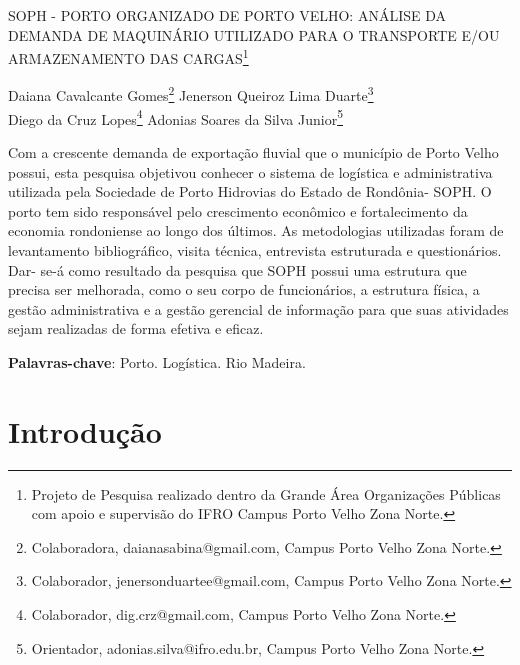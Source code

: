 \documentclass[article,12pt,onesidea,4paper,english,brazil]{abntex2}
\begin{document}
	
	
	\frenchspacing 
	
	\begin{center}
		\LARGE SOPH - PORTO ORGANIZADO DE PORTO VELHO:\MakeUppercase{ análise da demanda de maquinário utilizado para o transporte e/ou armazenamento das cargas}\footnote{Projeto de Pesquisa realizado dentro da Grande Área Organizações Públicas com apoio e supervisão do IFRO Campus Porto Velho Zona Norte.}
		
		\normalsize
		Daiana Cavalcante Gomes\footnote{Colaboradora, daianasabina@gmail.com, Campus Porto Velho Zona Norte.} 
		Jenerson Queiroz Lima Duarte\footnote{Colaborador, jenersonduartee@gmail.com, Campus Porto Velho Zona Norte.} \\
	Diego da Cruz Lopes\footnote{Colaborador, dig.crz@gmail.com, Campus Porto Velho Zona Norte.} 
	Adonias Soares da Silva Junior\footnote{Orientador, adonias.silva@ifro.edu.br, Campus Porto Velho Zona Norte.} 
	\end{center}
	
	\begin{resumoumacoluna}
		Com a crescente demanda de exportação fluvial que o município de Porto Velho possui, esta pesquisa objetivou conhecer o sistema de logística e administrativa utilizada pela Sociedade de Porto Hidrovias do Estado de Rondônia- SOPH. O porto tem sido responsável pelo crescimento econômico e fortalecimento da economia rondoniense ao longo dos últimos. As metodologias utilizadas foram de levantamento bibliográfico, visita técnica, entrevista estruturada e questionários. Dar- se-á como resultado da pesquisa que SOPH possui uma estrutura que precisa ser melhorada, como o seu corpo de funcionários, a estrutura física, a gestão administrativa e a gestão gerencial de informação para que suas atividades sejam realizadas de forma efetiva e eficaz.
		
		\vspace{\onelineskip}
		
		\noindent
		\textbf{Palavras-chave}: Porto. Logística. Rio Madeira.
	\end{resumoumacoluna}
	
	\section*{Introdução}
	
\end{document}
